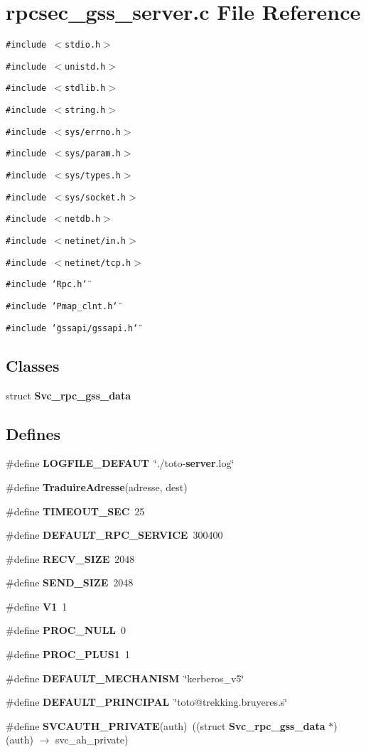 \section{rpcsec\_\-gss\_\-server.c File Reference}
\label{rpcsec__gss__server_8c}
{\tt \#include $<$stdio.h$>$}\par
{\tt \#include $<$unistd.h$>$}\par
{\tt \#include $<$stdlib.h$>$}\par
{\tt \#include $<$string.h$>$}\par
{\tt \#include $<$sys/errno.h$>$}\par
{\tt \#include $<$sys/param.h$>$}\par
{\tt \#include $<$sys/types.h$>$}\par
{\tt \#include $<$sys/socket.h$>$}\par
{\tt \#include $<$netdb.h$>$}\par
{\tt \#include $<$netinet/in.h$>$}\par
{\tt \#include $<$netinet/tcp.h$>$}\par
{\tt \#include \char`\"{}Rpc.h\char`\"{}}\par
{\tt \#include \char`\"{}Pmap\_\-clnt.h\char`\"{}}\par
{\tt \#include \char`\"{}gssapi/gssapi.h\char`\"{}}\par
\subsection*{Classes}
\begin{CompactItemize}
\item 
struct {\bf Svc\_\-rpc\_\-gss\_\-data}
\end{CompactItemize}
\subsection*{Defines}
\begin{CompactItemize}
\item 
\#define {\bf LOGFILE\_\-DEFAUT}\ \char`\"{}./toto-{\bf server}.log\char`\"{}
\item 
\#define {\bf Traduire\-Adresse}(adresse, dest)
\item 
\#define {\bf TIMEOUT\_\-SEC}\ 25
\item 
\#define {\bf DEFAULT\_\-RPC\_\-SERVICE}\ 300400
\item 
\#define {\bf RECV\_\-SIZE}\ 2048
\item 
\#define {\bf SEND\_\-SIZE}\ 2048
\item 
\#define {\bf V1}\ 1
\item 
\#define {\bf PROC\_\-NULL}\ 0
\item 
\#define {\bf PROC\_\-PLUS1}\ 1
\item 
\#define {\bf DEFAULT\_\-MECHANISM}\ \char`\"{}kerberos\_\-v5\char`\"{}
\item 
\#define {\bf DEFAULT\_\-PRINCIPAL}\ \char`\"{}toto@trekking.bruyeres.s\char`\"{}
\item 
\#define {\bf SVCAUTH\_\-PRIVATE}(auth)\ ((struct {\bf Svc\_\-rpc\_\-gss\_\-data} $\ast$)(auth) $\rightarrow$ svc\_\-ah\_\-private)
\end{CompactItemize}
